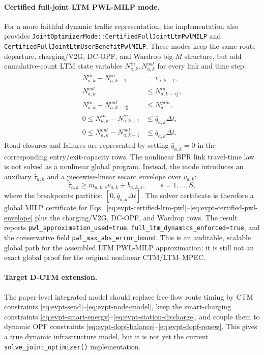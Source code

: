 \paragraph{Certified full-joint LTM PWL-MILP mode.}
For a more faithful dynamic traffic representation, the implementation also
provides
\texttt{JointOptimizerMode::CertifiedFullJointLtmPwlMILP} and
\texttt{CertifiedFullJointLtmUserBenefitPwlMILP}.  These modes keep the
same route--departure, charging/V2G, DC-OPF, and Wardrop big-\(M\) structure,
but add cumulative-count LTM state variables
\(N^{in}_{a,k},N^{out}_{a,k}\) for every link and time step:
\begin{align}
  N^{in}_{a,k}-N^{in}_{a,k-1} &= v_{a,k-1},\\
  N^{out}_{a,k} &\le N^{in}_{a,k-\tau^f_a},\\
  N^{in}_{a,k} - N^{out}_{a,k-\tau^b_a} &\le N^{jam}_a,\\
  0\le N^{in}_{a,k}-N^{in}_{a,k-1} &\le \bar q_{a,k}\Delta t,\\
  0\le N^{out}_{a,k}-N^{out}_{a,k-1} &\le \bar q_{a,k}\Delta t .
  \label{eq:evpt-certified-ltm-pwl}
\end{align}
Road closures and failures are represented by setting
\(\bar q_{a,k}=0\) in the corresponding entry/exit-capacity rows.  The
nonlinear BPR link travel-time law is not solved as a nonlinear global
program.  Instead, the mode introduces an auxiliary \(\hat\tau_{a,k}\) and a
piecewise-linear secant envelope over \(v_{a,k}\):
\begin{equation}
  \hat\tau_{a,k}\ge
  m_{a,k,s}v_{a,k}+b_{a,k,s},\qquad s=1,\ldots,S,
  \label{eq:evpt-certified-pwl-envelope}
\end{equation}
where the breakpoints partition \([0,\bar q_{a,k}\Delta t]\).  The solver
certificate is therefore a global MILP certificate for
Eqs.~\eqref{eq:evpt-certified-ltm-pwl}--\eqref{eq:evpt-certified-pwl-envelope}
plus the charging/V2G, DC-OPF, and Wardrop rows.  The result reports
\texttt{pwl\_approximation\_used=true},
\texttt{full\_ltm\_dynamics\_enforced=true}, and the conservative field
\texttt{pwl\_max\_abs\_error\_bound}.  This is an auditable, scalable
global path for the assembled LTM PWL-MILP approximation; it is still not an
exact global proof for the original nonlinear CTM/LTM--MPEC.

\paragraph{Target D-CTM extension.}
The paper-level integrated model should replace free-flow route timing by CTM
constraints \eqref{eq:evpt-send}--\eqref{eq:evpt-node-model}, keep the
smart-charging constraints
\eqref{eq:evpt-smart-energy}--\eqref{eq:evpt-station-discharge}, and couple
them to dynamic OPF constraints
\eqref{eq:evpt-dopf-balance}--\eqref{eq:evpt-dopf-renew}. This gives a true
dynamic infrastructure model, but it is not yet the current
\texttt{solve\_joint\_optimizer()} implementation.

